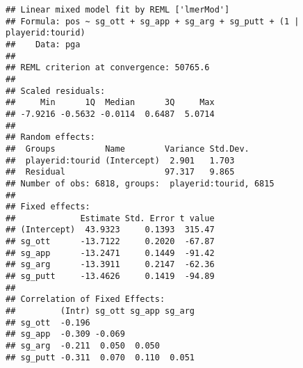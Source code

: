 \documentclass[
]{article}
\begin{document}
\begin{verbatim}
## Linear mixed model fit by REML ['lmerMod']
## Formula: pos ~ sg_ott + sg_app + sg_arg + sg_putt + (1 | playerid:tourid)
##    Data: pga
## 
## REML criterion at convergence: 50765.6
## 
## Scaled residuals: 
##     Min      1Q  Median      3Q     Max 
## -7.9216 -0.5632 -0.0114  0.6487  5.0714 
## 
## Random effects:
##  Groups          Name        Variance Std.Dev.
##  playerid:tourid (Intercept)  2.901   1.703   
##  Residual                    97.317   9.865   
## Number of obs: 6818, groups:  playerid:tourid, 6815
## 
## Fixed effects:
##             Estimate Std. Error t value
## (Intercept)  43.9323     0.1393  315.47
## sg_ott      -13.7122     0.2020  -67.87
## sg_app      -13.2471     0.1449  -91.42
## sg_arg      -13.3911     0.2147  -62.36
## sg_putt     -13.4626     0.1419  -94.89
## 
## Correlation of Fixed Effects:
##         (Intr) sg_ott sg_app sg_arg
## sg_ott  -0.196                     
## sg_app  -0.309 -0.069              
## sg_arg  -0.211  0.050  0.050       
## sg_putt -0.311  0.070  0.110  0.051
\end{verbatim}
\end{document}
